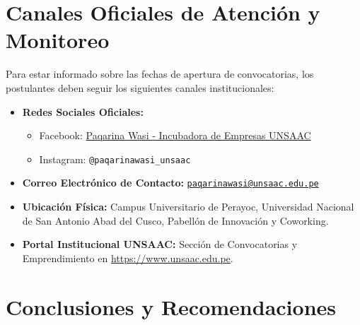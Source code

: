 ﻿\documentclass[12pt,a4paper]{article}
\begin{document}
\section{Canales Oficiales de Atención y Monitoreo}

Para estar informado sobre las fechas de apertura de convocatorias, los postulantes deben seguir los siguientes canales institucionales:

\begin{itemize}[leftmargin=*]
    \item \textbf{Redes Sociales Oficiales:}
    \begin{itemize}
        \item Facebook: \href{https://www.facebook.com/PaqarinaWasiUNSAAC}{Paqarina Wasi - Incubadora de Empresas UNSAAC}
        \item Instagram: \texttt{@paqarinawasi\_unsaac}
    \end{itemize}
    \item \textbf{Correo Electrónico de Contacto:} \href{mailto:paqarinawasi@unsaac.edu.pe}{\texttt{paqarinawasi@unsaac.edu.pe}}
    \item \textbf{Ubicación Física:} Campus Universitario de Perayoc, Universidad Nacional de San Antonio Abad del Cusco, Pabellón de Innovación y Coworking.
    \item \textbf{Portal Institucional UNSAAC:} Sección de Convocatorias y Emprendimiento en \url{https://www.unsaac.edu.pe}.
\end{itemize}

\section{Conclusiones y Recomendaciones}
\end{document}
